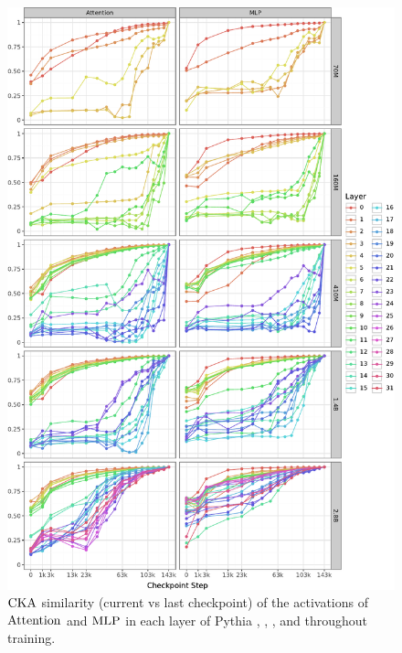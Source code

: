 \begin{figure}[h!]
    \centering
    \includegraphics[width=0.9\linewidth]{chapters/tending-towards-stability/figures/cka_full_lines.pdf}
    \vspace{-5pt}
    \caption{$\mathrm{CKA}$ similarity (current vs last checkpoint) of the activations of $\mathrm{Attention}$ and $\mathrm{MLP}$ in each layer of Pythia , , ,  and  throughout training.}%
    \label{fig:cka-layer-wise-lines}
\end{figure}
\clearpage

